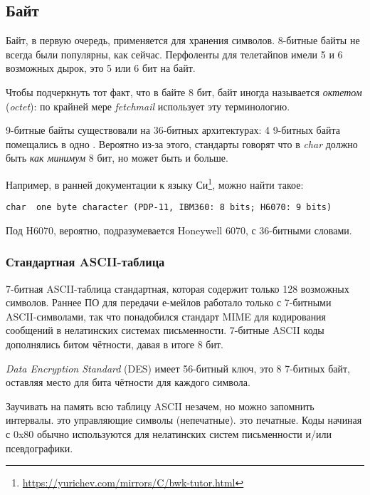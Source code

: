 \subsection{Байт}

Байт, в первую очередь, применяется для хранения символов.
8-битные байты не всегда были популярны, как сейчас.
Перфоленты для телетайпов имели 5 и 6 возможных дырок, это 5 или 6 бит на байт.

Чтобы подчеркнуть тот факт, что в байте 8 бит, байт иногда называется \emph{октетом} (\emph{octet}):
по крайней мере \emph{fetchmail} использует эту терминологию.

9-битные байты существовали на 36-битных архитектурах: 4 9-битных байта помещались в одно .
Вероятно из-за этого, стандарты \CCpp говорят что в \emph{char} должно быть \emph{как минимум} 8 бит, но может быть и больше.

Например, в ранней документации к языку Си\footnote{\url{https://yurichev.com/mirrors/C/bwk-tutor.html}}, можно найти такое:

\begin{lstlisting}
char  one byte character (PDP-11, IBM360: 8 bits; H6070: 9 bits) 
\end{lstlisting}

Под H6070, вероятно, подразумевается Honeywell 6070, с 36-битными словами.

\subsubsection{Стандартная ASCII-таблица}

7-битная ASCII-таблица стандартная, которая содержит только 128 возможных символов.
Раннее ПО для передачи е-мейлов работало только с 7-битными ASCII-символами, так что понадобился стандарт \ac{MIME}
для кодирования сообщений в нелатинских системах письменности.
7-битные ASCII коды дополнялись битом чётности, давая в итоге 8 бит.

\emph{Data Encryption Standard} (\ac{DES}) имеет 56-битный ключ, это 8 7-битных байт,
оставляя место для бита чётности для каждого символа.

Заучивать на память всю таблицу \ac{ASCII} незачем, но можно запомнить интервалы.
 это управляющие символы (непечатные).
 это печатные.
Коды начиная с 0x80 обычно используются для нелатинских систем письменности и/или псевдографики.

